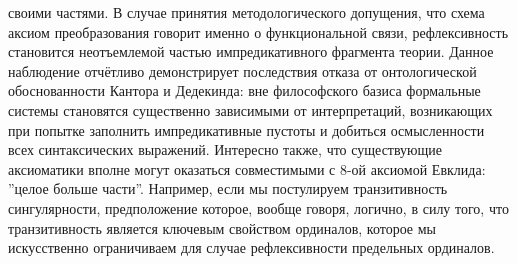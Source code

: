 \documentclass[12pt]{article}
\begin{document}
своими частями. В случае принятия методологического допущения, что схема аксиом преобразования говорит именно о функциональной связи, рефлексивность становится неотъемлемой частью импредикативного фрагмента теории. Данное наблюдение отчётливо демонстрирует последствия отказа от онтологической обоснованности Кантора и Дедекинда: вне философского базиса формальные системы становятся существенно зависимыми от интерпретаций, возникающих при попытке заполнить импредикативные пустоты и добиться осмысленности всех синтаксических выражений. Интересно также, что существующие аксиоматики вполне могут оказаться совместимыми с 8-ой аксиомой Евклида: ''целое больше части''. Например, если мы постулируем транзитивность сингулярности, предположение которое, вообще говоря, логично, в силу того, что транзитивность является ключевым свойством ординалов, которое мы искусственно ограничиваем для случае рефлексивности предельных ординалов. 
\end{document}
